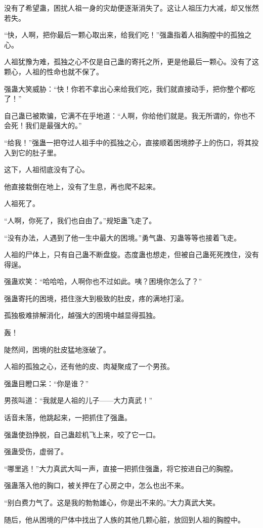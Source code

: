 \begin{this_body}
没有了希望蛊，困扰人祖一身的灾劫便逐渐消失了。这让人祖压力大减，却又怅然若失。

“快，人啊，把你最后一颗心取出来，给我们吃！”强蛊指着人祖胸膛中的孤独之心。

人祖犹豫为难，孤独之心不仅是自己蛊的寄托之所，更是他最后一颗心。没有了这颗心，人祖的性命也就不保了。

强蛊大笑威胁：“快！你若不拿出心来给我们吃，我们就直接动手，把你整个都吃了！”

自己蛊已被欺骗，它满不在乎地道：“人啊，你给他们就是。我无所谓的，你也不会死！我们是最强大的。”

“给我！”强蛊一把夺过人祖手中的孤独之心，直接顺着困境脖子上的伤口，将其投入到它的肚子里。

这下，人祖彻底没有了心。

他直接栽倒在地上，没有了生息，再也爬不起来。

人祖死了。

“人啊，你死了，我们也自由了。”规矩蛊飞走了。

“没有办法，人遇到了他一生中最大的困境。”勇气蛊、刃蛊等等也接着飞走。

人祖的尸体上，只有自己蛊不断盘旋。态度蛊也想走，但被自己蛊死死拽住，没有得逞。

强蛊欢笑：“哈哈哈，人啊你也不过如此。咦？困境你怎么了？”

强蛊寄托的困境，捂住涨大到极致的肚皮，疼的满地打滚。

孤独极难排解消化，越强大的困境中越显得孤独。

轰！

陡然间，困境的肚皮猛地涨破了。

人祖的孤独之心，还有他的皮、肉凝聚成了一个男孩。

强蛊目瞪口呆：“你是谁？”

男孩叫道：“我就是人祖的儿子——大力真武！”

话音未落，他跳起来，一把抓住了强蛊。

强蛊使劲挣脱，自己蛊趁机飞上来，咬了它一口。

强蛊受伤，虚弱了。

“哪里逃！”大力真武大叫一声，直接一把抓住强蛊，将它按进自己的胸膛。

强蛊落入他的胸口，被关押在了心房之中，怎么也出不来。

“别白费力气了。这是我的勃勃雄心，你是出不来的。”大力真武大笑。

随后，他从困境的尸体中找出了人族的其他几颗心脏，放回到人祖的胸膛中。


\end{this_body}
